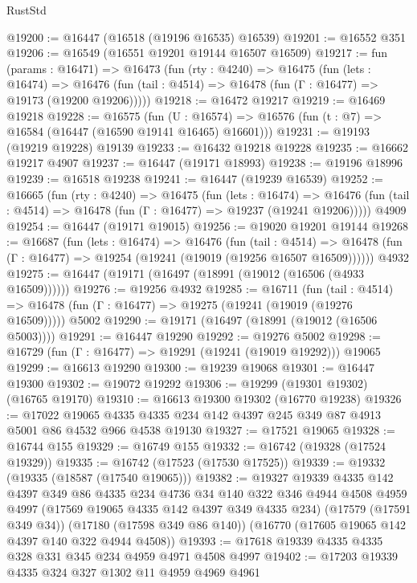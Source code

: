 \begin{lexlean}{RustStd}
\begin{coremodule}
@19200 := @16447 (@16518 (@19196 @16535) @16539)
@19201 := @16552 @351
@19206 := @16549 (@16551 @19201 @19144 @16507 @16509)
@19217 := fun (params : @16471) =>
  @16473
    (fun (rty : @4240) =>
    @16475
      (fun (lets : @16474) =>
      @16476 (fun (tail : @4514) => @16478 (fun (Γ : @16477) => @19173 (@19200 @19206)))))
@19218 := @16472 @19217
@19219 := @16469 @19218
@19228 := @16575
    (fun (U : @16574) => @16576 (fun (t : @7) => @16584 (@16447 (@16590 @19141 @16465) @16601)))
@19231 := @19193 (@19219 @19228) @19139
@19233 := @16432 @19218 @19228
@19235 := @16662 @19217 @4907
@19237 := @16447 (@19171 @18993)
@19238 := @19196 @18996
@19239 := @16518 @19238
@19241 := @16447 (@19239 @16539)
@19252 := @16665
    (fun (rty : @4240) =>
    @16475
      (fun (lets : @16474) =>
      @16476 (fun (tail : @4514) => @16478 (fun (Γ : @16477) => @19237 (@19241 @19206)))))
    @4909
@19254 := @16447 (@19171 @19015)
@19256 := @19020 @19201 @19144
@19268 := @16687
    (fun (lets : @16474) =>
    @16476
      (fun (tail : @4514) =>
      @16478 (fun (Γ : @16477) => @19254 (@19241 (@19019 (@19256 @16507 @16509))))))
    @4932
@19275 := @16447 (@19171 (@16497 (@18991 (@19012 (@16506 (@4933 @16509))))))
@19276 := @19256 @4932
@19285 := @16711
    (fun (tail : @4514) => @16478 (fun (Γ : @16477) => @19275 (@19241 (@19019 (@19276 @16509)))))
    @5002
@19290 := @19171 (@16497 (@18991 (@19012 (@16506 @5003))))
@19291 := @16447 @19290
@19292 := @19276 @5002
@19298 := @16729 (fun (Γ : @16477) => @19291 (@19241 (@19019 @19292))) @19065
@19299 := @16613 @19290
@19300 := @19239 @19068
@19301 := @16447 @19300
@19302 := @19072 @19292
@19306 := @19299 (@19301 @19302) (@16765 @19170)
@19310 := @16613 @19300 @19302 (@16770 @19238)
@19326 := @17022
    @19065
    @4335
    @4335
    @234
    @142
    @4397
    @245
    @349
    @87
    @4913
    @5001
    @86
    @4532
    @966
    @4538
    @19130
@19327 := @17521 @19065
@19328 := @16744 @155
@19329 := @16749 @155
@19332 := @16742 (@19328 (@17524 @19329))
@19335 := @16742 (@17523 (@17530 @17525))
@19339 := @19332 (@19335 (@18587 (@17540 @19065)))
@19382 := @19327
    @19339
    @4335
    @142
    @4397
    @349
    @86
    @4335
    @234
    @4736
    @34
    @140
    @322
    @346
    @4944
    @4508
    @4959
    @4997
    (@17569 @19065 @4335 @142 @4397 @349 @4335 @234)
    (@17579 (@17591 @349 @34))
    (@17180 (@17598 @349 @86 @140))
    (@16770 (@17605 @19065 @142 @4397 @140 @322 @4944 @4508))
@19393 := @17618 @19339 @4335 @4335 @328 @331 @345 @234 @4959 @4971 @4508 @4997
@19402 := @17203 @19339 @4335 @324 @327 @1302 @11 @4959 @4969 @4961

\end{coremodule}
\end{lexlean}
